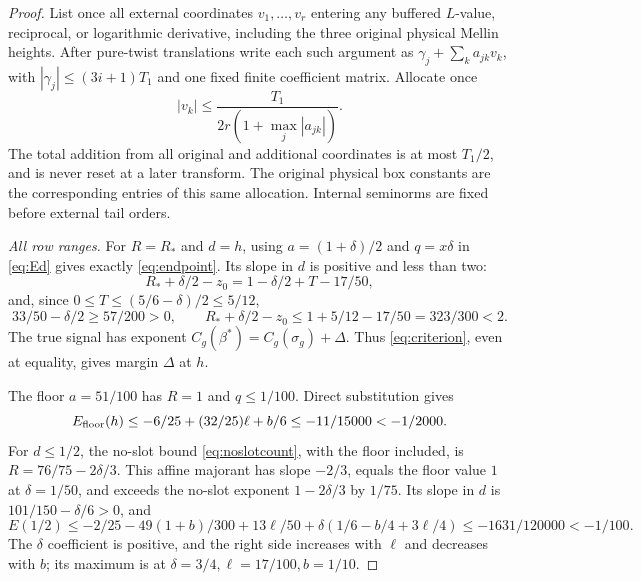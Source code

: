 \begin{proof}
List once all external coordinates $v_1,\ldots,v_r$ entering any buffered $L$-value, reciprocal, or logarithmic derivative, including the three original physical Mellin heights. After pure-twist translations write each such argument as $\gamma_j+\sum_k a_{jk}v_k$, with $|\gamma_j|\le(3i+1)T_1$ and one fixed finite coefficient matrix. Allocate once
\begin{equation}\label{eq:heightallocation}
 |v_k|\le\frac{T_1}{2r(1+\max_j|a_{jk}|)}.
\end{equation}
The total addition from all original and additional coordinates is at most $T_1/2$, and is never reset at a later transform. The original physical box constants are the corresponding entries of this same allocation. Internal seminorms are fixed before external tail orders.

\emph{All row ranges.}
For $R=R_*$ and $d=h$, using $a=(1+\delta)/2$ and $q=x\delta$ in \eqref{eq:Ed} gives exactly \eqref{eq:endpoint}. Its slope in $d$ is positive and less than two:
\[
 R_*+\delta/2-z_0=1-\delta/2+T-17/50,
\]
and, since $0\le T\le(5/6-\delta)/2\le5/12$,
\[
 33/50-\delta/2\ge57/200>0,\qquad
 R_*+\delta/2-z_0\le1+5/12-17/50=323/300<2.
\]
The true signal has exponent $C_g(\beta^*)=C_g(\sigma_g)+\Delta$. Thus \eqref{eq:criterion}, even at equality, gives margin $\Delta$ at $h$.

The floor $a=51/100$ has $R=1$ and $q\le1/100$. Direct substitution gives
\begin{equation}\label{eq:floor}
 E_{\rm floor}(h)\le-6/25+(32/25)\ell+b/6\le-11/15000<-1/2000.
\end{equation}
For $d\le1/2$, the no-slot bound \eqref{eq:noslotcount}, with the floor included, is $R=76/75-2\delta/3$. This affine majorant has slope $-2/3$, equals the floor value $1$ at $\delta=1/50$, and exceeds the no-slot exponent $1-2\delta/3$ by $1/75$. Its slope in $d$ is $101/150-\delta/6>0$, and
\begin{equation}\label{eq:middle}
 E(1/2)\le-2/25-49(1+b)/300+13\ell/50
               +\delta(1/6-b/4+3\ell/4)
 \le-1631/120000<-1/100.
\end{equation}
The $\delta$ coefficient is positive, and the right side increases with $\ell$ and decreases with $b$; its maximum is at $\delta=3/4,\ell=17/100,b=1/10$.


\end{proof}
